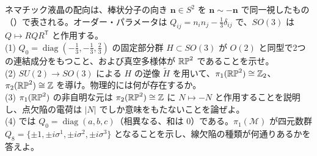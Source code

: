\begin{problem}[難易度 C]\label{ch03-prob-nematic}
ネマチック液晶の配向は、棒状分子の向き $\bm n\in S^2$ を $\bm n\sim-\bm n$ で同一視したもの（）で表される。オーダー・パラメータは $Q_{ij}=n_in_j-\frac13\delta_{ij}$ で、$SO(3)$ は $Q\mapsto RQR^{\mathsf T}$ と作用する。\\
(1) $Q_0=\operatorname{diag}(-\frac13,-\frac13,\frac23)$ の固定部分群 $H\subset SO(3)$ が $O(2)$ と同型で2つの連結成分をもつこと、および真空多様体が $\mathbb{RP}^2$ であることを示せ。\\
(2) $SU(2)\to SO(3)$ による $H$ の逆像 $\tilde H$ を用いて、$\pi_1(\mathbb{RP}^2)\cong\mathbb{Z}_2$、$\pi_2(\mathbb{RP}^2)\cong\mathbb{Z}$ を導け。物理的には何が存在するか。\\
(3) $\pi_1(\mathbb{RP}^2)$ の非自明な元は $\pi_2(\mathbb{RP}^2)\cong\mathbb{Z}$ に $N\mapsto-N$ と作用することを説明し、点欠陥の電荷は $\lvert N\rvert$ でしか意味をもたないことを論ぜよ。\\
(4) では $Q_0=\operatorname{diag}(a,b,c)$（相異なる、和は $0$）である。$\pi_1(\mathcal M)$ が四元数群 $Q_8=\{\pm1,\pm i\sigma^1,\pm i\sigma^2,\pm i\sigma^3\}$ となることを示し、線欠陥の種類が何通りあるかを答えよ。
\end{problem}

